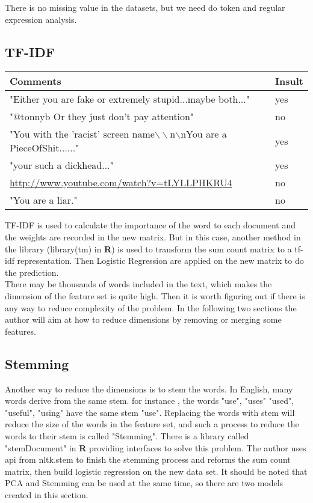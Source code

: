 \documentclass[11pt]{article}
\begin{document}
\begin{singlespacing}
There is no missing value in the datasets, but we need do token and regular expression analysis.

\subsection{TF-IDF}
\begin{center}
\begin{tabular}{|p{12cm}|p{2cm}|}
\hline
\textbf{Comments}             &  \textbf{Insult} \\ \hline
"Either you are fake or extremely stupid...maybe both..."  & yes \\ \hline
"$@$tonnyb  Or they just don't pay attention"  & no \\ \hline
"You with the 'racist' screen name$\backslash\backslash$n$\backslash$nYou are a PieceOfShit......"  & yes \\ \hline
"your such a dickhead..." & yes \\ \hline
\url{http://www.youtube.com/watch?v=tLYLLPHKRU4} & no \\ \hline
"You are a liar." & no \\
\hline
\end{tabular}
\end{center}

TF-IDF is used to calculate the importance of the word to each document and the weights are recorded in the new matrix. But in this case, another method in the library (library(tm) in \textbf{R}) is used to transform the sum count matrix to a tf-idf representation. Then Logistic Regression are applied on the new matrix to do the prediction.\\

There may be thousands of words included in the text, which makes the dimension of the feature set is quite high. Then it is worth figuring out if there is any way to reduce complexity of the problem. In the following two sections the author will aim at how to reduce dimensions by removing or merging some features.

\subsection{Stemming}
Another way to reduce the dimensions is to stem the words. In English, many words derive from the same stem. for instance , the words "use", "uses" "used", "useful", "using" have the same stem "use". Replacing the words with stem will reduce the size of the words in the feature set, and such a process to reduce the words to their stem is called "Stemming". There is a library called "stemDocument" in \textbf{R} providing interfaces to solve this problem. The author uses api from nltk.stem to finish the stemming process and reforms the sum count matrix, then build logistic regression on the new data set. It should be noted that PCA and Stemming can be used at the same time, so there are two models created in this section.


\end{singlespacing}
\end{document}
